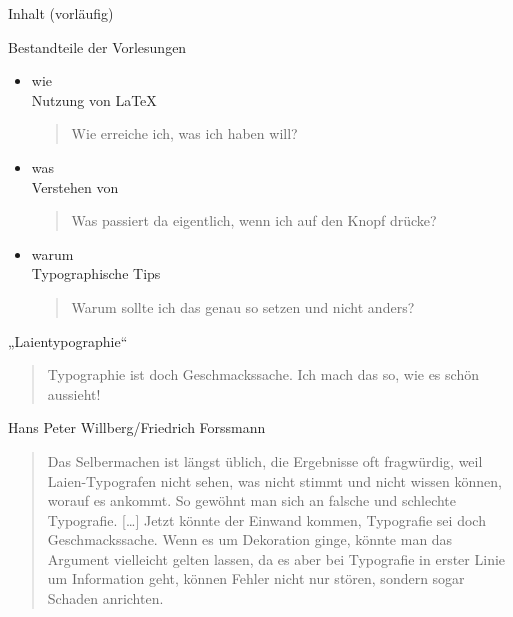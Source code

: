 \begin{frame}{Inhalt (vorläufig)}
\end{frame}

\begin{frame}{Bestandteile der Vorlesungen}
\begin{itemize}
\item \alert{wie}\\ Nutzung von \LaTeX
\\ \begin{quote}Wie erreiche ich, was ich haben will?\end{quote}
\item \alert{was}\\ Verstehen von \LaTeXTeX
\\ \begin{quote} Was passiert da eigentlich, wenn ich auf den Knopf drücke?\end{quote}
\item \alert{warum}\\ Typographische Tips
\\ \begin{quote}Warum sollte ich das genau so setzen und nicht anders?\end{quote}
\end{itemize}
\end{frame}

\begin{frame}{„Laientypographie“}
\begin{quote}
Typographie ist doch Geschmackssache. Ich mach das so, wie es schön aussieht!
\end{quote}
\pause
\begin{block}{Hans Peter Willberg/Friedrich Forssmann}
\begin{quotation}Das Selbermachen ist längst üblich, die Ergebnisse oft fragwürdig, weil Laien-Typografen nicht sehen, was nicht stimmt und nicht wissen können, worauf es ankommt. So gewöhnt man sich an falsche und schlechte Typografie. [\dots] Jetzt könnte der Einwand kommen, Typografie sei doch Geschmackssache. Wenn es um Dekoration ginge, könnte man das Argument vielleicht gelten lassen, da es aber bei Typografie in erster Linie um Information geht, können Fehler nicht nur stören, sondern sogar Schaden anrichten.
\end{quotation}
\end{block}
\end{frame}

